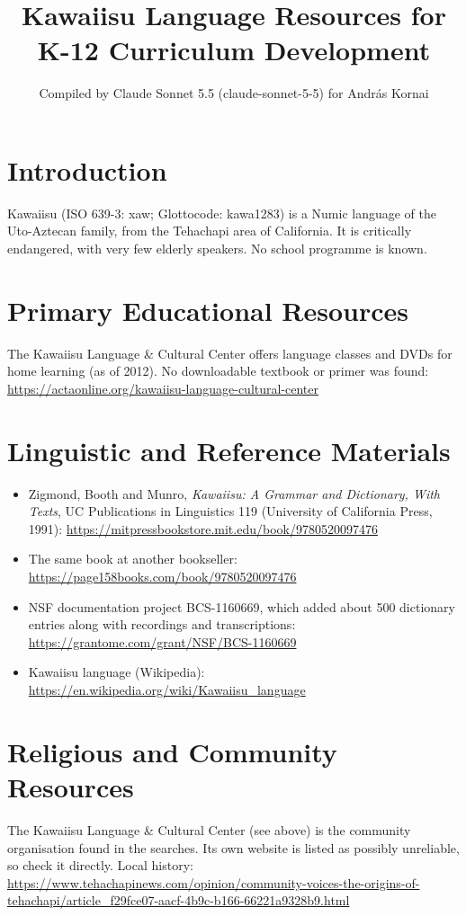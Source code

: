 \documentclass[12pt]{article}
\title{Kawaiisu Language Resources for K-12 Curriculum Development}
\author{Compiled by Claude Sonnet 5.5 (claude-sonnet-5-5) for Andr\'as Kornai}
\date{}
\begin{document}
\maketitle

\section{Introduction}
Kawaiisu (ISO 639-3: xaw; Glottocode: kawa1283) is a Numic language of the Uto-Aztecan family, from the Tehachapi area of California. It is critically endangered, with very few elderly speakers. No school programme is known.

\section{Primary Educational Resources}
The Kawaiisu Language \& Cultural Center offers language classes and DVDs for home learning (as of 2012). No downloadable textbook or primer was found: \url{https://actaonline.org/kawaiisu-language-cultural-center}

\section{Linguistic and Reference Materials}
\begin{itemize}
\item Zigmond, Booth and Munro, \emph{Kawaiisu: A Grammar and Dictionary, With Texts}, UC Publications in Linguistics 119 (University of California Press, 1991): \url{https://mitpressbookstore.mit.edu/book/9780520097476}
\item The same book at another bookseller: \url{https://page158books.com/book/9780520097476}
\item NSF documentation project BCS-1160669, which added about 500 dictionary entries along with recordings and transcriptions: \url{https://grantome.com/grant/NSF/BCS-1160669}
\item Kawaiisu language (Wikipedia): \url{https://en.wikipedia.org/wiki/Kawaiisu_language}
\end{itemize}

\section{Religious and Community Resources}
The Kawaiisu Language \& Cultural Center (see above) is the community organisation found in the searches. Its own website is listed as possibly unreliable, so check it directly. Local history: \url{https://www.tehachapinews.com/opinion/community-voices-the-origins-of-tehachapi/article_f29fce07-aacf-4b9c-b166-66221a9328b9.html}
\end{document}
